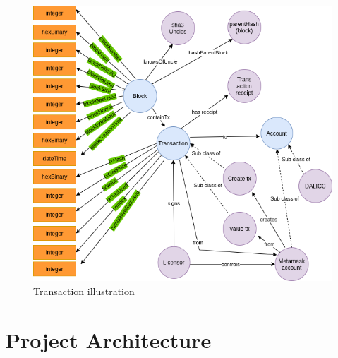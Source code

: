 \begin{itemize}
\begin{center}
\begin{figure}[htb!]
\begin{minipage}{0.75\linewidth}
			\includegraphics[width=1.45\textwidth]{images/chap03_knowledge_graph.png}
		\end{minipage}
		\caption{Transaction illustration}
		
	\end{figure}
	
\end{center}

\end{itemize}
\section{Project Architecture}

